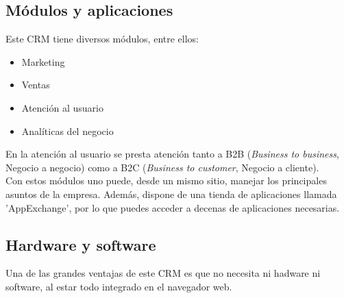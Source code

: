 \documentclass[openany,overnay,a4paper, twoside, 12pt]{book}
\begin{document}
\subsection{Módulos y aplicaciones}
Este CRM tiene diversos módulos, entre ellos: 
\begin{itemize}
    \item  Marketing
    \item Ventas
    \item Atención al usuario
    \item Analíticas del negocio
\end{itemize}
En la atención al usuario se presta atención tanto a B2B (\textit{Business to business}, Negocio a negocio) como a B2C (\textit{Business to customer}, Negocio a cliente).\\ 
Con estos módulos uno puede, desde un mismo sitio, manejar los principales asuntos de la empresa. Además, dispone de una tienda de aplicaciones llamada 'AppExchange', por lo que puedes acceder a decenas de aplicaciones necesarias.
\newpage
\subsection{Hardware y software}
Una de las grandes ventajas de este CRM es que no necesita ni hadware ni software, al estar todo integrado en el navegador web.  
\end{document}
